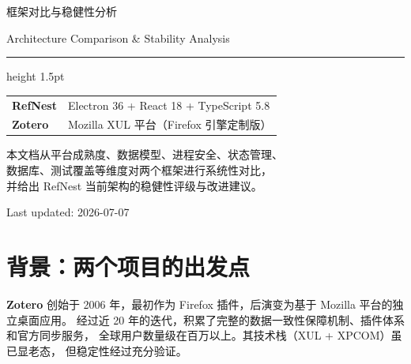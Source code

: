 \documentclass[12pt, a4paper]{article}
\begin{document}
\begin{titlepage}
  \centering
  \vspace*{2.5cm}


  \vspace{1em}
  {\Large\color{sectionblue} 框架对比与稳健性分析}\par
  \vspace{0.4em}
  {\large Architecture Comparison \& Stability Analysis}\par
  \vspace{2em}
  \hrule height 1.5pt \relax
  \vspace{2em}

  {\normalsize
  \begin{tabular}{ll}
    \textbf{RefNest} & Electron 36 + React 18 + TypeScript 5.8 \\
    \textbf{Zotero}  & Mozilla XUL 平台（Firefox 引擎定制版）\\
  \end{tabular}
  }\par

  \vspace{3cm}
  {\small
  本文档从平台成熟度、数据模型、进程安全、状态管理、\\
  数据库、测试覆盖等维度对两个框架进行系统性对比，\\
  并给出 RefNest 当前架构的稳健性评级与改进建议。
  }\par
  \vfill
  {\small\color{gray} Last updated: 2026-07-07}
\end{titlepage}

\tableofcontents
\newpage

\section{背景：两个项目的出发点}

\textbf{Zotero} 创始于 2006 年，最初作为 Firefox 插件，后演变为基于 Mozilla 平台的独立桌面应用。
经过近 20 年的迭代，积累了完整的数据一致性保障机制、插件体系和官方同步服务，
全球用户数量级在百万以上。其技术栈（XUL + XPCOM）虽已显老态，
但稳定性经过充分验证。
\end{document}
